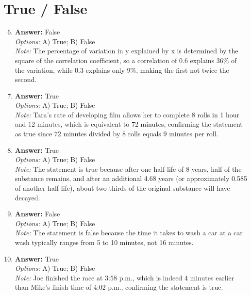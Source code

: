 \documentclass[12pt]{article}
\begin{document}
\section*{True / False}
\begin{enumerate}[label=\arabic*.]
\setcounter{enumi}{5}
\item \textbf{Answer:} False
\\ \textit{Options:} A) True; B) False
\\ \textit{Note:} The percentage of variation in y explained by x is determined by the square of the correlation coefficient, so a correlation of 0.6 explains 36\% of the variation, while 0.3 explains only 9\%, making the first not twice the second.
\item \textbf{Answer:} True
\\ \textit{Options:} A) True; B) False
\\ \textit{Note:} Tara's rate of developing film allows her to complete 8 rolls in 1 hour and 12 minutes, which is equivalent to 72 minutes, confirming the statement as true since 72 minutes divided by 8 rolls equals 9 minutes per roll.
\item \textbf{Answer:} True
\\ \textit{Options:} A) True; B) False
\\ \textit{Note:} The statement is true because after one half-life of 8 years, half of the substance remains, and after an additional 4.68 years (or approximately 0.585 of another half-life), about two-thirds of the original substance will have decayed.
\item \textbf{Answer:} False
\\ \textit{Options:} A) True; B) False
\\ \textit{Note:} The statement is false because the time it takes to wash a car at a car wash typically ranges from 5 to 10 minutes, not 16 minutes.
\item \textbf{Answer:} True
\\ \textit{Options:} A) True; B) False
\\ \textit{Note:} Joe finished the race at 3:58 p.m., which is indeed 4 minutes earlier than Mike's finish time of 4:02 p.m., confirming the statement is true.
\end{enumerate}
\end{document}
